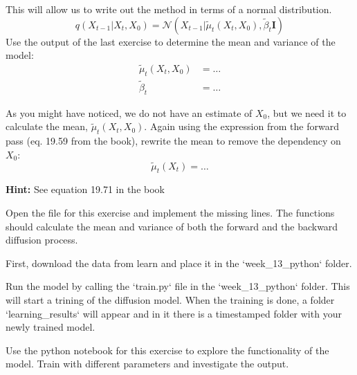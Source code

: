 \documentclass[12pt]{article}    %
\begin{document}
\exminor
This will allow us to write out the method in terms of a normal distribution. 
\begin{equation} \label{eq:forward-process-distribution}
    q(X_{t-1}|X_{t}, X_0) = \mathcal{N}(X_{t-1}| \tilde{\mu}_t(X_t, X_0), \tilde{\beta}_t \mathbf{I})
\end{equation}
Use the output of the last exercise to determine the mean and variance of the model:
\begin{align}
  \tilde{\mu}_t(X_t, X_0) &= \dots \\
  \tilde{\beta}_t &= \dots
\end{align}

\exminorhard
As you might have noticed, we do not have an estimate of $X_0$, but we need it to calculate the mean, $\tilde{\mu}_t(X_t, X_0)$.
Again using the expression from the forward pass (eq. 19.59 from the book), rewrite the mean to remove the dependency on $X_0$:
\begin{equation}
  \tilde{\mu}_t(X_t) = \dots
\end{equation}

\textbf{Hint:} See equation 19.71 in the book


\exminor 
Open the file for this exercise and implement the missing lines. 
The functions should calculate the mean and variance of both the forward and the backward diffusion process.

\exminor
First, download the data from learn and place it in the `week\_13\_python` folder.
 
Run the model by calling the `train.py` file in the `week\_13\_python` folder. This will start a trining of the diffusion model.
When the training is done, a folder `learning\_results` will appear and in it there is a timestamped folder with your newly trained model.

Use the python notebook for this exercise to explore the functionality of the model. Train with different parameters and investigate the output.
\end{document}
